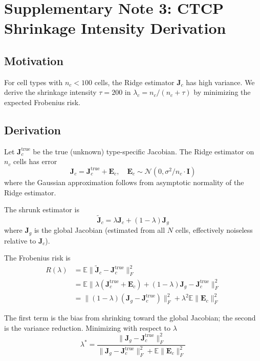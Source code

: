\documentclass[11pt,a4paper]{article}
\newcommand{\Jmat}{\mathbf{J}}
\begin{document}
\section*{Supplementary Note 3: CTCP Shrinkage Intensity Derivation}
\label{sup:shrinkage}

\subsection*{Motivation}

For cell types with $n_c < 100$ cells, the Ridge estimator $\Jmat_c$ has high variance. We derive the shrinkage intensity $\tau = 200$ in $\lambda_c = n_c/(n_c + \tau)$ by minimizing the expected Frobenius risk.

\subsection*{Derivation}

Let $\Jmat_c^{\text{true}}$ be the true (unknown) type-specific Jacobian. The Ridge estimator on $n_c$ cells has error \begin{equation}
\Jmat_c = \Jmat_c^{\text{true}} + \mathbf{E}_c, \quad \mathbf{E}_c \sim \mathcal{N}(0, \sigma^2/n_c \cdot \mathbf{I})
\end{equation}
where the Gaussian approximation follows from asymptotic normality of the Ridge estimator.

The shrunk estimator is \begin{equation}
\tilde{\Jmat}_c = \lambda\Jmat_c + (1-\lambda)\Jmat_g
\end{equation}
where $\Jmat_g$ is the global Jacobian (estimated from all $N$ cells, effectively noiseless relative to $\Jmat_c$).

The Frobenius risk is \begin{equation}
\begin{aligned}
R(\lambda) &= \mathbb{E}\|\tilde{\Jmat}_c - \Jmat_c^{\text{true}}\|_F^2 \\
&= \mathbb{E}\|\lambda(\Jmat_c^{\text{true}} + \mathbf{E}_c) + (1-\lambda)\Jmat_g - \Jmat_c^{\text{true}}\|_F^2 \\
&= \|(1-\lambda)(\Jmat_g - \Jmat_c^{\text{true}})\|_F^2 + \lambda^2 \mathbb{E}\|\mathbf{E}_c\|_F^2
\end{aligned}
\end{equation}

The first term is the bias from shrinking toward the global Jacobian; the second is the variance reduction. Minimizing with respect to $\lambda$ \begin{equation}
\lambda^* = \frac{\|\Jmat_g - \Jmat_c^{\text{true}}\|_F^2}{\|\Jmat_g - \Jmat_c^{\text{true}}\|_F^2 + \mathbb{E}\|\mathbf{E}_c\|_F^2}
\end{equation}
\end{document}
